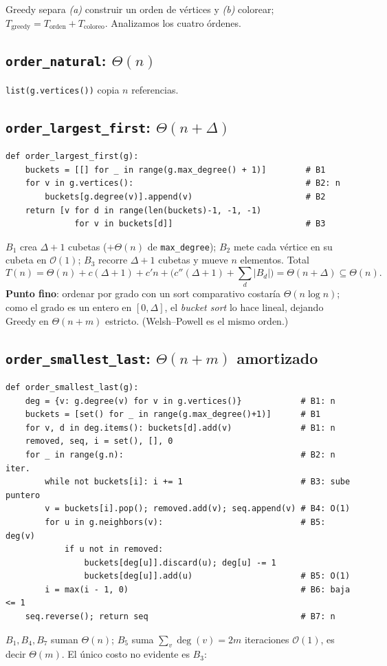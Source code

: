 \documentclass[11pt,a4paper]{article}
\theoremstyle{definition}
\theoremstyle{remark}
\newcommand{\dg}{\operatorname{deg}}
\newcommand{\bigO}{\mathcal{O}}
\begin{document}
Greedy separa \emph{(a)} construir un orden de vértices y \emph{(b)} colorear;
$T_{\text{greedy}}=T_{\text{orden}}+T_{\text{coloreo}}$. Analizamos los cuatro
órdenes.

\subsection{\texttt{order\_natural}: $\Theta(n)$}
\texttt{list(g.vertices())} copia $n$ referencias.

\subsection{\texttt{order\_largest\_first}: $\Theta(n+\Delta)$}
\begin{lstlisting}
def order_largest_first(g):
    buckets = [[] for _ in range(g.max_degree() + 1)]        # B1
    for v in g.vertices():                                   # B2: n
        buckets[g.degree(v)].append(v)                       # B2
    return [v for d in range(len(buckets)-1, -1, -1)
              for v in buckets[d]]                           # B3
\end{lstlisting}
$B_1$ crea $\Delta+1$ cubetas ($+\Theta(n)$ de \texttt{max\_degree}); $B_2$ mete
cada vértice en su cubeta en $\bigO(1)$; $B_3$ recorre $\Delta+1$ cubetas y mueve
$n$ elementos. Total
\[
T(n)=\Theta(n)+c(\Delta{+}1)+c'n+\Big(c''(\Delta{+}1)+\textstyle\sum_{d}|B_d|\Big)
=\Theta(n+\Delta)\subseteq\Theta(n).
\]
\textbf{Punto fino}: ordenar por grado con un sort comparativo costaría
$\Theta(n\log n)$; como el grado es un entero en $[0,\Delta]$, el \emph{bucket
sort} lo hace lineal, dejando Greedy en $\Theta(n+m)$ estricto. (Welsh--Powell es
el mismo orden.)

\subsection{\texttt{order\_smallest\_last}: $\Theta(n+m)$ amortizado}\label{sec:sl}
\begin{lstlisting}
def order_smallest_last(g):
    deg = {v: g.degree(v) for v in g.vertices()}            # B1: n
    buckets = [set() for _ in range(g.max_degree()+1)]      # B1
    for v, d in deg.items(): buckets[d].add(v)              # B1: n
    removed, seq, i = set(), [], 0
    for _ in range(g.n):                                    # B2: n iter.
        while not buckets[i]: i += 1                        # B3: sube puntero
        v = buckets[i].pop(); removed.add(v); seq.append(v) # B4: O(1)
        for u in g.neighbors(v):                            # B5: deg(v)
            if u not in removed:
                buckets[deg[u]].discard(u); deg[u] -= 1
                buckets[deg[u]].add(u)                      # B5: O(1)
        i = max(i - 1, 0)                                   # B6: baja <= 1
    seq.reverse(); return seq                               # B7: n
\end{lstlisting}
$B_1,B_4,B_7$ suman $\Theta(n)$; $B_5$ suma $\sum_v\dg(v)=2m$ iteraciones
$\bigO(1)$, es decir $\Theta(m)$. El único costo no evidente es $B_3$:
\end{document}
